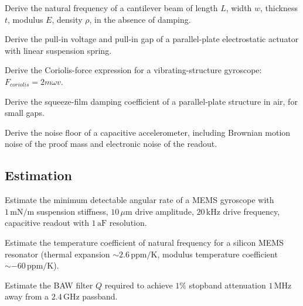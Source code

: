\begin{exercise}
Derive the natural frequency of a cantilever beam of length $L$, width $w$, thickness $t$, modulus $E$, density $\rho$, in the absence of damping.
\end{exercise}

\begin{exercise}
Derive the pull-in voltage and pull-in gap of a parallel-plate electrostatic actuator with linear suspension spring.
\end{exercise}

\begin{exercise}
Derive the Coriolis-force expression for a vibrating-structure gyroscope: $F_{coriolis} = 2 m \omega v$.
\end{exercise}

\begin{exercise}
Derive the squeeze-film damping coefficient of a parallel-plate structure in air, for small gaps.
\end{exercise}

\begin{exercise}
Derive the noise floor of a capacitive accelerometer, including Brownian motion noise of the proof mass and electronic noise of the readout.
\end{exercise}

\subsection*{Estimation}

\begin{exercise}
Estimate the minimum detectable angular rate of a MEMS gyroscope with $1\,\text{mN/m}$ suspension stiffness, $10\,\mu\text{m}$ drive amplitude, $20\,\text{kHz}$ drive frequency, capacitive readout with $1\,\text{aF}$ resolution.
\end{exercise}

\begin{exercise}
Estimate the temperature coefficient of natural frequency for a silicon MEMS resonator (thermal expansion $\sim 2.6\,\text{ppm/K}$, modulus temperature coefficient $\sim -60\,\text{ppm/K}$).
\end{exercise}

\begin{exercise}
Estimate the BAW filter $Q$ required to achieve $1\%$ stopband attenuation $1\,\text{MHz}$ away from a $2.4\,\text{GHz}$ passband.
\end{exercise}

